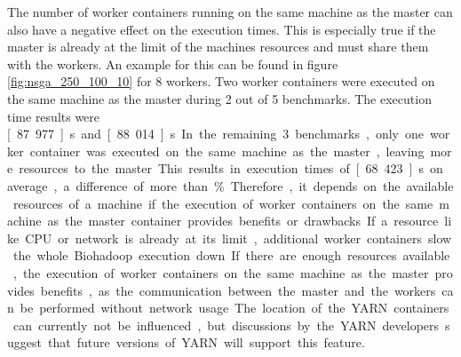 The number of worker containers running on the same machine as the master can also have a negative effect on the execution times. This is especially true if the master is already at the limit of the machines resources and must share them with the workers. An example for this can be found in figure \ref{fig:nsga_250_100_10} for 8 workers. Two worker containers were executed on the same machine as the master during 2 out of 5 benchmarks. The execution time results were \unit[87.977]{s} and \unit[88.014]{s}. In the remaining 3 benchmarks, only one worker container was executed on the same machine as the master, leaving more resources to the master. This results in execution times of \unit[68.423]{s} on average, a difference of more than \unit[20]{\%}.

Therefore, it depends on the available resources of a machine if the execution of worker containers on the same machine as the master container provides benefits or drawbacks. If a resource like CPU or network is already at its limit, additional worker containers slow the whole Biohadoop execution down. If there are enough resources available, the execution of worker containers on the same machine as the master provides benefits, as the communication between the master and the workers can be performed without network usage.

The location of the YARN containers can currently not be influenced, but discussions by the YARN developers suggest that future versions of YARN will support this feature.

% 

